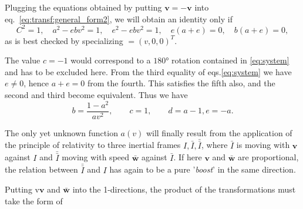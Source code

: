 Plugging the equations obtained by putting $ \mathbf{v} = -\mathbf{v} $ into eq.~\eqref{eq:transf:general_form2}, we will obtain an identity only if
\begin{equation}
C^2=1, \quad a^2-ebv^2=1,\quad e^2-ebv^2=1,\quad e(a+e)=0,\quad b(a+e)=0,
\label{eq:system}
\end{equation}
as is best checked by specializing $ \mathbf = (v, 0, 0)^T $.

The value $ c = -1 $ would correspond to a $ 180° $ rotation contained in \eqref{eq:system} and has to be excluded here. From the third equality of eqs.\eqref{eq:system} we have $ e\neq 0 $, hence $ a + e = 0 $ from the fourth. This satisfies the fifth also, and the second and third become equivalent. Thus we have 
\begin{equation}
b=\frac{1-a^2}{av^2}, \qquad c=1,\qquad d=a-1, e=-a.
\end{equation}

The only yet unknown function $ a( v) $ will finally result from the application of the principle of relativity to three inertial frames $ I, \bar{I}, \bar{\bar{I}} $, where $ \bar{I} $ is moving with $ \mathbf{v} $ against $ I $ and $ \bar{\bar{I}} $ moving with speed $ \mathbf{\bar{w}} $ against $ \bar{I} $. If here $ \mathbf{v} $ and $ \mathbf{\bar{w}} $ are proportional, the relation
between $ \bar{\bar{I}} $ and $ I $ has again to be a pure '\emph{boost}' in the same direction.

Putting v$ \mathbf{v} $ and $ \mathbf{\bar{w}} $ into the 1-directions, the product of the transformations must take the form of 



